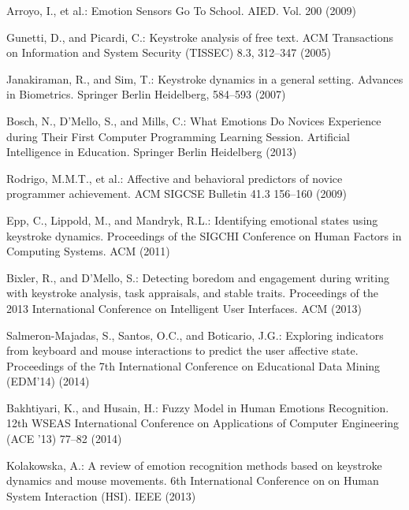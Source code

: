 \documentclass[runningheads,a4paper]{llncs}
\begin{document}
\begin{thebibliography}{4}
 Arroyo, I., et al.: Emotion Sensors Go To School. AIED. Vol. 200 (2009)

 Gunetti, D., and Picardi, C.: Keystroke analysis of free text. ACM Transactions on Information and System Security (TISSEC) 8.3, 312--347 (2005)

 Janakiraman, R., and Sim, T.: Keystroke dynamics in a general setting. Advances in Biometrics. Springer Berlin Heidelberg, 584--593 (2007)

 Bosch, N., D'Mello, S., and Mills, C.: What Emotions Do Novices Experience during Their First Computer Programming Learning Session. Artificial Intelligence in Education. Springer Berlin Heidelberg (2013)

 Rodrigo, M.M.T., et al.: Affective and behavioral predictors of novice programmer achievement. ACM SIGCSE Bulletin 41.3 156--160 (2009)

 Epp, C., Lippold, M., and Mandryk, R.L.: Identifying emotional states using keystroke dynamics. Proceedings of the SIGCHI Conference on Human Factors in Computing Systems. ACM (2011)

 Bixler, R., and D'Mello, S.: Detecting boredom and engagement during writing with keystroke analysis, task appraisals, and stable traits. Proceedings of the 2013 International Conference on Intelligent User Interfaces. ACM (2013)

 Salmeron-Majadas, S., Santos, O.C., and Boticario, J.G.: Exploring indicators from keyboard and mouse interactions to predict the user affective state. Proceedings of the 7th International Conference on Educational Data Mining (EDM'14) (2014)

 Bakhtiyari, K., and Husain, H.: Fuzzy Model in Human Emotions Recognition. 12th WSEAS International Conference on Applications of Computer Engineering (ACE '13) 77--82 (2014)

 Kolakowska, A.: A review of emotion recognition methods based on keystroke dynamics and mouse movements. 6th International Conference on on Human System Interaction (HSI). IEEE (2013)
  
  

\end{thebibliography}
\end{document}
